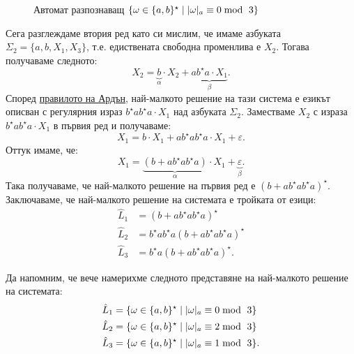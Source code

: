 \begin{example}
  \begin{figure}[H]
    \centering
    \caption{Автомат разпознаващ $\{\omega \in \{a,b\}^\star \mid \abs{\omega}_{a} \equiv 0 \bmod\ 3\}$}
  \end{figure}
  
  Сега разглеждаме втория ред като си мислим, че имаме азбуката $\Sigma_2 = \{a,b,X_1,X_3\}$, т.е. едиствената свободна променлива е $X_2$.
  Тогава получаваме следното:
  \[X_2 = \underbrace{b}_{\alpha} \cdot X_2 + \underbrace{a b^\star a \cdot X_1}_{\beta}.\]
  Според \hyperref[prob:reg:arden]{правилото на Ардън}, най-малкото решение на тази система е езикът описван с регулярния израз $b^\star a b^\star a \cdot X_1$
  над азбуката $\Sigma_2$.
  Заместваме $X_2$ с израза $b^\star a b^\star a \cdot X_1$ в първия ред и получаваме:
  \[X_1 = b \cdot X_1 + ab^\star a b^\star a \cdot X_1  + \varepsilon.\]
  Оттук имаме, че:
  \[X_1 = \underbrace{(b + ab^\star a b^\star a)}_{\alpha} \cdot X_1 + \underbrace{\varepsilon}_{\beta}.\]
  Така получаваме, че най-малкото решение на първия ред е $(b + ab^\star a b^\star a)^\star$.
  Заключаваме, че най-малкото решение на системата е тройката от езици:
  \begin{align*}
    \hat{L}_1 & = (b + ab^\star a b^\star a)^\star\\
    \hat{L}_2 & = b^\star a b^\star a (b + ab^\star a b^\star a)^\star\\
    \hat{L}_3 & = b^\star a (b + ab^\star a b^\star a)^\star.
  \end{align*}
  
  Да напомним, че вече намерихме следното представяне на най-малкото решение на системата:
  \begin{align*}
    \hat{L}_1 & = \{\omega \in \{a,b\}^\star \mid \vert{\omega}\vert_{a} \equiv 0 \bmod\ 3\}\\
    \hat{L}_2 & = \{\omega \in \{a,b\}^\star \mid \vert{\omega}\vert_{a} \equiv 2 \bmod\ 3\}\\
    \hat{L}_3 & = \{\omega \in \{a,b\}^\star \mid \vert{\omega}\vert_{a} \equiv 1 \bmod\ 3\}.
  \end{align*}
\end{example}

